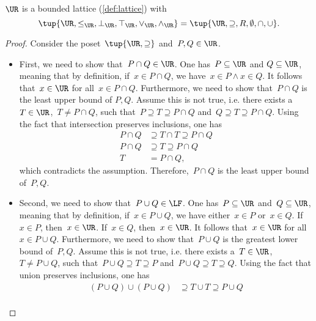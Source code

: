 \begin{lemma}
    \label{lem:u_bounded_lat}
    $\UR$ is a bounded lattice (\cref{def:lattice}) with
    \begin{equation}
        \tup{\UR,\leq_{\UR},\bot_{\UR},\top_{\UR},\vee_{\UR},\wedge_{\UR}}=\tup{\UR,\supseteq,R,\emptyset,\cap,\cup}.
    \end{equation}
    \begin{proof}
        Consider the poset~$\tup{\UR,\supseteq}$ and~$P,Q\in \UR$.
        \begin{itemize}
            \item First, we need to show that~$P\cap Q\in \UR$. One has~$P \subseteq \UR$ and $Q\subseteq \UR$, meaning that by definition, if~$x\in P\cap Q$, we have~$x\in P \wedge x\in Q$. It follows that~$x\in \UR$ for all~$x\in P\cap Q$. Furthermore, we need to show that~$P\cap Q$ is the least upper bound of $P,Q$. Assume this is not true, i.e. there exists a~$T\in \UR$,~$T\neq P\cap Q$, such that~$P\supseteq T\supseteq P\cap Q$ and~$Q\supseteq T\supseteq P\cap Q$. Using the fact that intersection preserves inclusions, one has
            \begin{equation}
                \begin{aligned}
                    P\cap Q &\supseteq T\cap T \supseteq P\cap Q\\
                    P\cap Q &\supseteq T \supseteq P\cap Q\\
                    T&= P\cap Q,
                \end{aligned}
            \end{equation}
            which contradicts the assumption. Therefore,~$P\cap Q$ is the least upper bound of~$P,Q$.
            \item Second, we need to show that~$P\cup Q\in \LF$. One has~$P\subseteq \UR$ and~$Q\subseteq \UR$, meaning that by definition, if~$x\in P\cup Q$, we have either~$x\in P$ or~$x\in Q$. If~$x\in P$, then~$x\in \UR$. If~$x\in Q$, then~$x\in \UR$. It follows that~$x\in \UR$ for all~$x\in P\cup Q$. Furthermore, we need to show that~$P\cup Q$ is the greatest lower bound of~$P,Q$. Assume this is not true, i.e. there exists a~$T\in \UR$,~$T\neq P\cup Q$, such that~$P\cup Q\supseteq T\supseteq P$ and~$P\cup Q\supseteq T\supseteq Q$. Using the fact that union preserves inclusions, one has
            \begin{equation}
                \begin{aligned}
                (P\cup Q)
                    \cup (P\cup Q) &\supseteq T \cup T \supseteq P\cup Q\\

\end{aligned}
\end{equation}
\end{itemize}
\end{proof}
\end{lemma}

